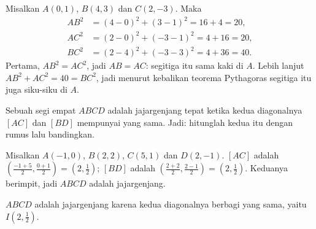 \begin{example}\label{ex:g10:coordgeom:triangle}
Misalkan $A(0, 1)$, $B(4, 3)$ dan $C(2, -3)$. Maka
\begin{align*}
AB^2 &= (4-0)^2 + (3-1)^2 = 16 + 4 = 20, \\
AC^2 &= (2-0)^2 + (-3-1)^2 = 4 + 16 = 20, \\
BC^2 &= (2-4)^2 + (-3-3)^2 = 4 + 36 = 40 .
\end{align*}
Pertama, $AB^2 = AC^2$, jadi $AB = AC$: segitiga itu sama kaki di $A$.
Lebih lanjut $AB^2 + AC^2 = 40 = BC^2$, jadi menurut kebalikan teorema
Pythagoras segitiga itu juga siku-siku di $A$.
\end{example}

\begin{method}\label{met:g10:coordgeom:parallelogram}
Sebuah segi empat $ABCD$ adalah jajargenjang tepat ketika kedua diagonalnya
$[AC]$ dan $[BD]$ mempunyai  yang sama. Jadi: hitunglah kedua
 itu dengan rumus  lalu bandingkan.
\end{method}

\begin{example}\label{ex:g10:coordgeom:parallelogram}
Misalkan $A(-1, 0)$, $B(2, 2)$, $C(5, 1)$ dan $D(2, -1)$. 
$[AC]$ adalah $\left(\frac{-1+5}{2}, \frac{0+1}{2}\right) = (2, \frac12)$;
 $[BD]$ adalah $\left(\frac{2+2}{2}, \frac{2-1}{2}\right) =
(2, \frac12)$. Keduanya berimpit, jadi $ABCD$ adalah jajargenjang.
\end{example}

\begin{omfigure}

{\small $ABCD$ adalah jajargenjang karena kedua diagonalnya berbagi  yang sama, yaitu $I(2, \frac12)$.}
\end{omfigure}

